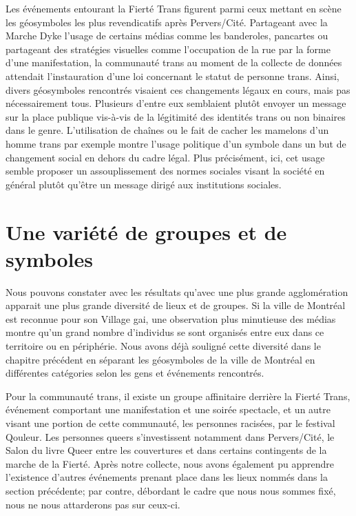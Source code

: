 Les événements entourant la Fierté Trans figurent parmi ceux mettant en scène les géosymboles les plus revendicatifs après Pervers/Cité.
Partageant avec la Marche Dyke l'usage de certains médias comme les banderoles, pancartes ou partageant des stratégies visuelles comme l'occupation de la rue par la forme d'une manifestation, la communauté trans au moment de la collecte de données attendait l'instauration d'une loi concernant le statut de personne trans.
Ainsi, divers géosymboles rencontrés visaient ces changements légaux en cours, mais pas nécessairement tous.
Plusieurs d'entre eux semblaient plutôt envoyer un message sur la place publique vis-à-vis de la légitimité des identités trans ou non binaires dans le genre.
L'utilisation de chaînes ou le fait de cacher les mamelons d'un homme trans par exemple montre l'usage politique d'un symbole dans un but de changement social en dehors du cadre légal. Plus précisément, ici, cet usage semble proposer un assouplissement des normes sociales visant la société en général plutôt qu'être un message dirigé aux institutions sociales.

\section{Une variété de groupes et de symboles}
\label{sec:une_variete_de_groupes_et_de_symboles}
Nous pouvons constater avec les résultats qu'avec une plus grande agglomération apparait une plus grande diversité de lieux et de groupes.
Si la ville de Montréal est reconnue pour son Village gai, une observation plus minutieuse des médias \lgbt{} montre qu'un grand nombre d'individus se sont organisés entre eux dans ce territoire ou en périphérie.
Nous avons déjà souligné cette diversité dans le chapitre précédent en séparant les géosymboles de la ville de Montréal en différentes catégories selon les gens et événements rencontrés.

Pour la communauté trans, il existe un groupe affinitaire derrière la Fierté Trans, événement comportant une manifestation et une soirée spectacle, et un autre visant une portion de cette communauté, les personnes racisées, par le festival Qouleur.
Les personnes queers s'investissent notamment dans Pervers/Cité, le Salon du livre Queer entre les couvertures et dans certains contingents de la marche de la Fierté.
Après notre collecte, nous avons également pu apprendre l'existence d'autres événements prenant place dans les lieux nommés dans la section précédente; par contre, débordant le cadre que nous nous sommes fixé, nous ne nous attarderons pas sur ceux-ci.


